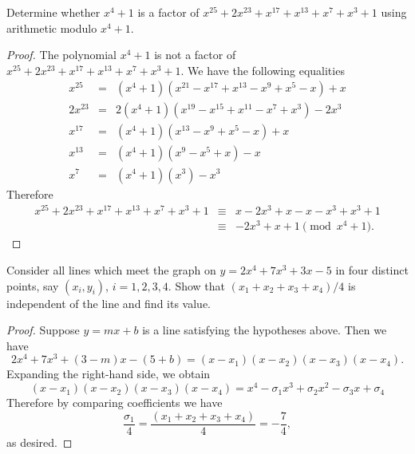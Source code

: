 \documentclass[10pt]{amsart}
\begin{document}
\begin{thm}\label{ex1}
  Determine whether $x^4 + 1$ is a factor of $x^{25} + 2x^{23} + x^{17} + x^{13} + x^7 + x^3 + 1$ using arithmetic modulo $x^4 + 1$.
  
  \begin{proof}
    The polynomial $x^4 + 1$ is not a factor of $x^{25} + 2x^{23} + x^{17} + x^{13} + x^7 + x^3 + 1$.
    We have the following equalities
    \begin{eqnarray*}
      x^{25} &=& (x^4 + 1)(x^{21} - x^{17} + x^{13} - x^9 + x^5 - x) + x\\
      2x^{23} &=& 2(x^4 + 1)(x^{19} - x^{15} + x^{11} - x^7 + x^3) - 2x^3\\
      x^{17} &=& (x^4 + 1)(x^{13} - x^9 + x^5 - x) + x\\
      x^{13} &=& (x^4 + 1)(x^9 - x^5 + x) - x\\
      x^7 &=& (x^4 + 1)(x^3) - x^3
    \end{eqnarray*}
    Therefore 
    \begin{eqnarray*}
      x^{25} + 2x^{23} + x^17 + x^13 + x^7 + x^3 + 1 &\equiv& x - 2x^3 + x - x - x^3 + x^3 + 1\\
      &\equiv& -2x^3 + x + 1 \pmod{x^4 + 1}.
    \end{eqnarray*}
  \end{proof}
\end{thm}

\begin{thm}\label{ex1}
  Consider all lines which meet the graph on $y = 2x^4 + 7x^3 + 3x - 5$ in four distinct points, say $(x_i, y_i)$, $i = 1, 2, 3, 4$.
  Show that $(x_1 + x_2 + x_3 + x_4)/4$ is independent of the line and find its value.
  
  \begin{proof}
    Suppose $y = mx + b$ is a line satisfying the hypotheses above.
    Then we have
    $$2x^4 + 7x^3 + (3 - m)x - (5 + b) = (x - x_1)(x - x_2)(x - x_3)(x - x_4).$$ 
    Expanding the right-hand side, we obtain
    $$(x - x_1)(x - x_2)(x - x_3)(x - x_4) = x^4 - \sigma_1 x^3 + \sigma_2 x^2 - \sigma_3 x + \sigma_4$$
    Therefore by comparing coefficients we have
    $$\frac{\sigma_1}{4} = \frac{(x_1 + x_2 + x_3 + x_4)}{4} = -\frac{7}{4},$$
    as desired.
  \end{proof}
\end{thm}
\end{document}
